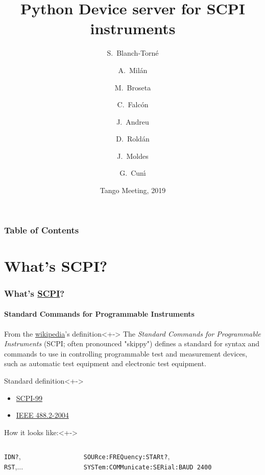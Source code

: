 \documentclass{beamer}
\title[Skippy]
  {Python Device server for SCPI instruments}
\author[Sergi Blanch-Torn\'e] %
{S.~Blanch-Torn\'e\inst{1} \and A.~Mil\'an\inst{2} \and M.~Broseta\inst{1} \and C.~Falc\'on\inst{1} \and J.~Andreu\inst{1} \and D.~Rold\'an\inst{1} \and J.~Moldes\inst{1} \and G.~Cun\'{\i}\inst{1}}
\institute[ALBA Synchrotron] %
{
  \inst{1}%
  ALBA Synchrotron, CELLS\\
  Cerdanyola del Vall\`es
  \and
  \inst{2}%
  MAX IV Laboratory\\
  Lund
}
\date[Hamburg 2019] %
{Tango Meeting, 2019}
\begin{document}
\frame{\titlepage}

\begin{frame}
\frametitle{Table of Contents}
\tableofcontents%
\end{frame}

% 

\section{What's SCPI?}

\begin{frame}
  \frametitle{What's \href{https://en.wikipedia.org/wiki/Standard_Commands_for_Programmable_Instruments}{SCPI}?}
  \framesubtitle{Standard Commands for Programmable Instruments}
  \begin{block}{From the \href{https://en.wikipedia.org/wiki/Standard_Commands_for_Programmable_Instruments}{wikipedia}'s definition}<+->
    The \emph{Standard Commands for Programmable Instruments} (SCPI; often pronounced "skippy") defines a standard for syntax and commands to use in controlling programmable test and measurement devices, such as automatic test equipment and electronic test equipment.
  \end{block}
  \begin{alertblock}{Standard definition}<+->
    \begin{itemize}
      \item \textcolor{AlbaBlue}{\href{http://www.ivifoundation.org/docs/scpi-99.pdf}{SCPI-99}}
      \item \textcolor{AlbaBlue}{\href{http://dx.doi.org/10.1109/IEEESTD.2004.95390}{IEEE 488.2-2004}}
    \end{itemize}
  \end{alertblock}
  \begin{exampleblock}{How it looks like:}<+->
    \begin{columns}
      \begin{column}{0.18\textwidth}
        {\tt *IDN?},\\
        {\tt *RST},...
      \end{column}
      \begin{column}{0.60\textwidth}
	\textcolor{AlbaBlue}{{\tt SOURce:FREQuency:STARt?}, \\{\tt SYSTem:COMMunicate:SERial:BAUD 2400}}
      \end{column}
    \end{columns}
  \end{exampleblock}
\end{frame}
  
\end{document}
